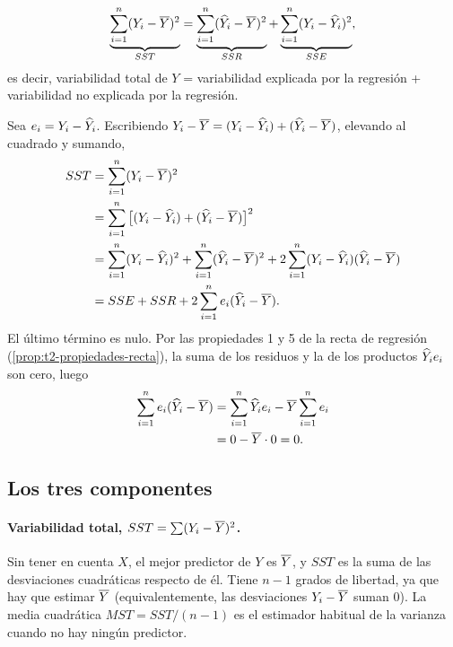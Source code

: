 \begin{teorema}
  \[
    \underbrace{\sum_{i=1}^{n} (Y_i-\overline{Y})^2}_{SST}
    = \underbrace{\sum_{i=1}^{n} (\widehat{Y}_i-\overline{Y})^2}_{SSR}
    + \underbrace{\sum_{i=1}^{n} (Y_i-\widehat{Y}_i)^2}_{SSE},
  \]
  es decir, variabilidad total de $Y$ = variabilidad explicada por la regresión + variabilidad no
  explicada por la regresión.
\end{teorema}

\begin{demostracion}
  Sea $e_i=Y_i-\widehat{Y}_i$. Escribiendo $Y_i-\overline{Y}=(Y_i-\widehat{Y}_i)+(\widehat{Y}_i-\overline{Y})$,
  elevando al cuadrado y sumando,
  \begin{align*}
    SST &= \sum_{i=1}^{n} (Y_i-\overline{Y})^2 \\
    &= \sum_{i=1}^{n} \big[(Y_i-\widehat{Y}_i)+(\widehat{Y}_i-\overline{Y})\big]^2 \\
    &= \sum_{i=1}^{n} (Y_i-\widehat{Y}_i)^2 + \sum_{i=1}^{n} (\widehat{Y}_i-\overline{Y})^2
       + 2\sum_{i=1}^{n} (Y_i-\widehat{Y}_i)(\widehat{Y}_i-\overline{Y}) \\
    &= SSE + SSR + 2\sum_{i=1}^{n} e_i(\widehat{Y}_i-\overline{Y}) .
  \end{align*}
  El último término es nulo. Por las propiedades 1 y 5 de la recta de regresión
  (\cref{prop:t2-propiedades-recta}), la suma de los residuos y la de los productos
  $\widehat{Y}_ie_i$ son cero, luego
  \begin{align*}
    \sum_{i=1}^{n} e_i(\widehat{Y}_i-\overline{Y}) &= \sum_{i=1}^{n} \widehat{Y}_ie_i - \overline{Y}\sum_{i=1}^{n} e_i \\
    &= 0 - \overline{Y}\cdot0 = 0 .
  \end{align*}
\end{demostracion}

\subsection{Los tres componentes}

\paragraph{Variabilidad total, $SST=\sum(Y_i-\overline{Y})^2$.} Sin tener en cuenta $X$, el mejor
predictor de $Y$ es $\overline{Y}$, y $SST$ es la suma de las desviaciones cuadráticas respecto de
él. Tiene $n-1$ grados de libertad, ya que hay que estimar $\overline{Y}$ (equivalentemente, las
desviaciones $Y_i-\overline{Y}$ suman 0). La media cuadrática $MST=SST/(n-1)$ es el estimador
habitual de la varianza cuando no hay ningún predictor.

